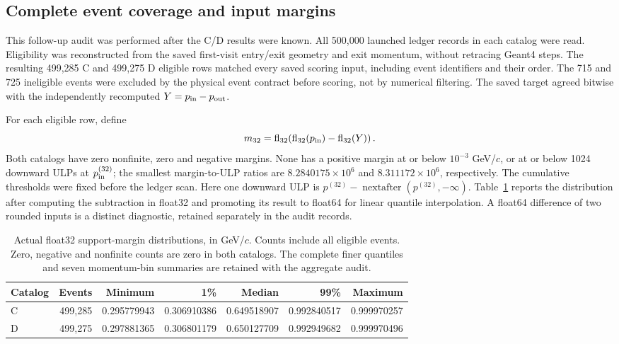 \subsection{Complete event coverage and input margins}

This follow-up audit was performed after the C/D results were known. All
500,000 launched ledger records in each catalog were read. Eligibility was
reconstructed from the saved first-visit entry/exit geometry and exit momentum,
without retracing Geant4 steps. The resulting 499,285 C and 499,275 D eligible
rows matched every saved scoring input, including event identifiers and their
order. The 715 and 725 ineligible events were excluded by the physical event
contract before scoring, not by numerical filtering. The saved target agreed
bitwise with the independently recomputed $Y=p_{\rm in}-p_{\rm out}$.

For each eligible row, define
\begin{equation}
 m_{32}=\operatorname{fl}_{32}\!\left(
 \operatorname{fl}_{32}(p_{\rm in})-\operatorname{fl}_{32}(Y)\right).
\end{equation}
Both catalogs have zero nonfinite, zero and negative margins. None has a
positive margin at or below $10^{-3}$ GeV/$c$, or at or below 1024 downward
ULPs at $p_{\rm in}^{(32)}$; the smallest margin-to-ULP ratios are
$8.2840175\times10^6$ and $8.311172\times10^6$, respectively. The cumulative
thresholds were fixed before the ledger scan. Here one downward ULP is
$p^{(32)}-\operatorname{nextafter}(p^{(32)},-\infty)$.
Table~\ref{tab:actual_support_margins} reports the distribution after computing
the subtraction in float32 and promoting its result to float64 for linear
quantile interpolation. A float64 difference of two rounded inputs is a
distinct diagnostic, retained separately in the audit records.

\begin{table}[!htbp]
\centering\small
\setlength{\tabcolsep}{4pt}
\caption{Actual float32 support-margin distributions, in GeV/$c$. Counts
include all eligible events. Zero, negative and nonfinite counts are zero in
both catalogs. The complete finer quantiles and seven momentum-bin summaries
are retained with the aggregate audit.}
\label{tab:actual_support_margins}
\begin{tabular}{lrrrrrr}
\toprule
Catalog & Events & Minimum & 1\% & Median & 99\% & Maximum\\
\midrule
C & 499,285 & 0.295779943 & 0.306910386 & 0.649518907 & 0.992840517 & 0.999970257\\
D & 499,275 & 0.297881365 & 0.306801179 & 0.650127709 & 0.992949682 & 0.999970496\\
\bottomrule
\end{tabular}
\end{table}

